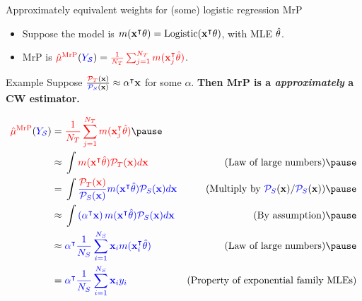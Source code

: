 \begin{frame}[t]{Approximately equivalent weights for (some) logistic regression MrP}

\def\alphav{\mathbf{\alpha}}
%
\begin{itemize}
    \item Suppose the model is $m(\mathbf{x}^\intercal \theta) = \mathrm{Logistic}(\mathbf{x}^\intercal \theta)$, with MLE $\hat{\theta}$.
    \item MrP is $\textcolor{red}{\hat{\mu}^{\mathrm{MrP}}}(\textcolor{blue}{\textcolor{blue}{Y_{\mathcal{S}}}}) = \textcolor{red}{\frac{1}{{\textcolor{red}{N_T}}} \sum_{j=1}^{\textcolor{red}{N_T}} m(\mathbf{x}_j^\intercal \hat{\theta})}$.
\end{itemize}

\begin{block}{Example}
Suppose
    $\frac{\tarcol{\ptar}(\x)}{\surcol{\psur}(\x)} \approx \alphav^\trans \x$ for some $\alpha$.
    \textbf{Then MrP is a \emph{approximately} a CW estimator.}
\end{block}
\pause
$$
\vspace{-1em}
\begin{aligned}
\muhatmrp ={}& \tarcol{\meantar \m(\x_j^\trans \thetahat)} \pause
\\ \approx{}&
    \int \tarcol{
        \m(\x^\trans \thetahat) \ptar(\x) d\x
    }
    & \textrm{(Law of large numbers)} \pause
\\ ={}&
    \int
    \surcol{
        \frac{\tarcol{\ptar(\x)}}{\psur(\x)} \m(\x^\trans \thetahat) \psur(\x) d\x
    }
    & \textrm{(Multiply by $\psur(\x) / \psur(\x)$)} \pause
\\ \approx{}&
    \int \surcol{
        \left( \alphav^\trans \x\right) \m(\x^\trans \thetahat) \psur(\x) d\x
    }
    & \textrm{(By assumption)} \pause
\\ \approx{}&
    \surcol{
        \alphav^\trans \meansur \x_i \m(\x_i^\trans \thetahat)
    }
    & \textrm{(Law of large numbers)}\pause
\\={}&
    \surcol{
        \alphav^\trans \meansur \x_i \y_i
    }
    & \textrm{(Property of exponential family MLEs)}
\end{aligned}
$$


\end{frame}



